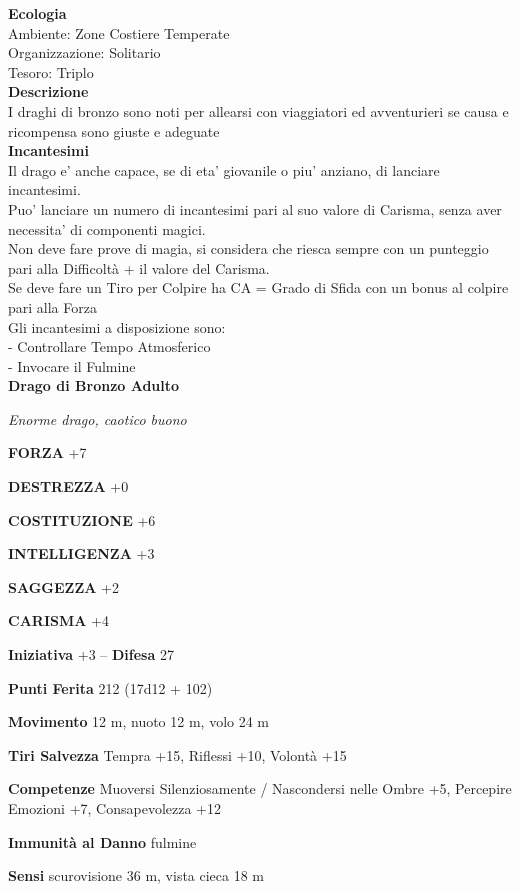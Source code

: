 \begin{multicols}{2}
\textbf{Ecologia}\\
Ambiente: Zone Costiere Temperate\\
Organizzazione: Solitario\\
Tesoro: Triplo\\
\textbf{Descrizione}\\
I draghi di bronzo sono noti per allearsi con viaggiatori ed avventurieri se causa e ricompensa sono giuste e adeguate\\
\textbf{Incantesimi}\\
Il drago e' anche capace, se di eta' giovanile o piu' anziano, di lanciare incantesimi.\\
Puo' lanciare un numero di incantesimi pari al suo valore di Carisma, senza aver necessita' di componenti magici.\\
Non deve fare prove di magia, si considera che riesca sempre con un punteggio pari alla Difficoltà + il valore del Carisma.\\
Se deve fare un Tiro per Colpire ha CA = Grado di Sfida con un bonus al colpire pari alla Forza\\
Gli incantesimi a disposizione sono:\\
- Controllare Tempo Atmosferico\\
- Invocare il Fulmine\\


\medskip{}\textbf{Drago di Bronzo Adulto}

\emph{Enorme drago, caotico buono}

\textbf{FORZA} +7

\textbf{DESTREZZA} +0

\textbf{COSTITUZIONE} +6

\textbf{INTELLIGENZA} +3

\textbf{SAGGEZZA} +2

\textbf{CARISMA} +4

\textbf{Iniziativa} +3 -- \textbf{Difesa} 27

\textbf{Punti Ferita} 212 (17d12 + 102)

\textbf{Movimento} 12 m, nuoto 12 m, volo 24 m

\textbf{Tiri Salvezza} Tempra +15, Riflessi +10, Volontà +15

\textbf{Competenze} Muoversi Silenziosamente / Nascondersi nelle Ombre +5, Percepire Emozioni +7, Consapevolezza +12

\textbf{Immunità al Danno} fulmine

\textbf{Sensi} scurovisione 36 m, vista cieca 18 m


\end{multicols}
